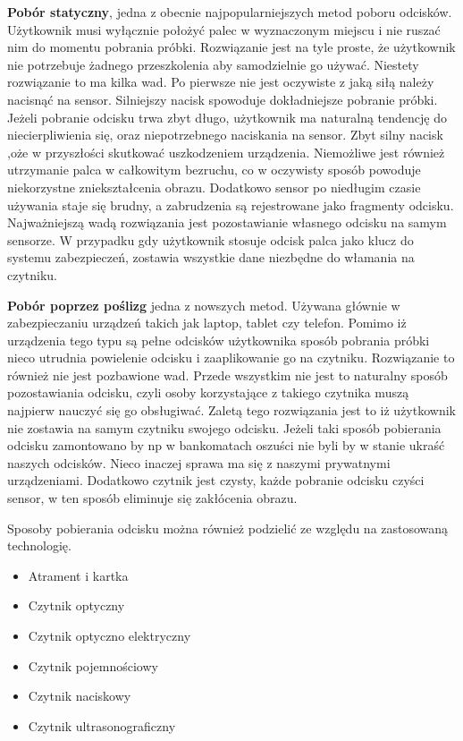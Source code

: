 \textbf{Pobór statyczny}, jedna z obecnie najpopularniejszych metod poboru odcisków. Użytkownik musi wyłącznie położyć palec w wyznaczonym miejscu i nie ruszać nim do momentu pobrania próbki. Rozwiązanie jest na tyle proste, że użytkownik nie potrzebuje żadnego przeszkolenia aby samodzielnie go używać. Niestety rozwiązanie to ma kilka wad. Po pierwsze nie jest oczywiste z jaką siłą należy nacisnąć na sensor. Silniejszy nacisk spowoduje dokładniejsze pobranie próbki. Jeżeli pobranie odcisku trwa zbyt długo, użytkownik ma naturalną tendencję do niecierpliwienia się, oraz niepotrzebnego naciskania na sensor. Zbyt silny nacisk ,oże w przyszłości skutkować uszkodzeniem urządzenia. Niemożliwe jest również utrzymanie palca w całkowitym bezruchu, co w oczywisty sposób powoduje niekorzystne zniekształcenia obrazu. Dodatkowo sensor po niedługim czasie używania staje się brudny, a zabrudzenia są rejestrowane jako fragmenty odcisku. Najważniejszą wadą rozwiązania jest pozostawianie własnego odcisku na samym sensorze. W przypadku gdy użytkownik stosuje odcisk palca jako klucz do systemu zabezpieczeń, zostawia wszystkie dane niezbędne do włamania na czytniku.
\vspace{.5cm}\par

\textbf{Pobór poprzez poślizg} jedna z nowszych metod. Używana głównie w zabezpieczaniu urządzeń takich jak laptop, tablet czy telefon. Pomimo iż urządzenia tego typu są pełne odcisków użytkownika sposób pobrania próbki nieco utrudnia powielenie odcisku i zaaplikowanie go na czytniku. Rozwiązanie to również nie jest pozbawione wad. Przede wszystkim nie jest to naturalny sposób pozostawiania odcisku, czyli osoby korzystające z takiego czytnika muszą najpierw nauczyć się go obsługiwać. Zaletą tego rozwiązania jest to iż użytkownik nie zostawia na samym czytniku swojego odcisku. Jeżeli taki sposób pobierania odcisku zamontowano by np w bankomatach oszuści nie byli by w stanie ukraść naszych odcisków. Nieco inaczej sprawa ma się z naszymi prywatnymi urządzeniami. Dodatkowo czytnik jest czysty, każde pobranie odcisku czyści sensor, w ten sposób eliminuje się zakłócenia obrazu. 
\vspace{.5cm}\par

Sposoby pobierania odcisku można również podzielić ze względu na zastosowaną technologię. 
\renewcommand*{\labelitemi}{\bullet}
\begin{itemize}
	\item Atrament i kartka
	\item Czytnik optyczny
	\item Czytnik optyczno elektryczny
	\item Czytnik pojemnościowy
	\item Czytnik naciskowy
	\item Czytnik ultrasonograficzny
\end{itemize}
\vspace{.5cm}\par

